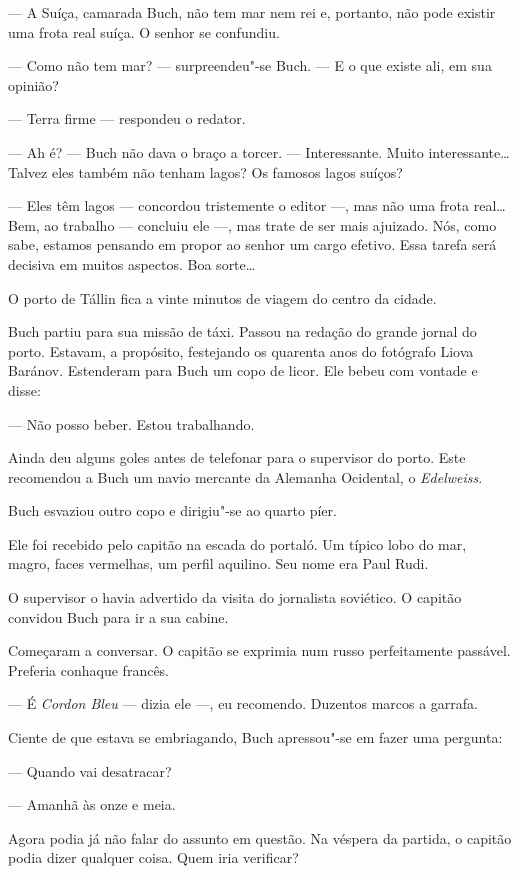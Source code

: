 --- A Suíça, camarada Buch, não tem mar nem rei e, portanto, não pode
existir uma frota real suíça. O senhor se confundiu.

--- Como não tem mar? --- surpreendeu"-se Buch. --- E o que existe ali,
em sua opinião?

--- Terra firme --- respondeu o redator.

--- Ah é? --- Buch não dava o braço a torcer. --- Interessante. Muito
interessante\ldots{} Talvez eles também não tenham lagos? Os famosos lagos
suíços?

--- Eles têm lagos --- concordou tristemente o editor ---, mas não uma
frota real\ldots{} Bem, ao trabalho --- concluiu ele ---, mas trate de ser
mais ajuizado. Nós, como sabe, estamos pensando em propor ao senhor um
cargo efetivo. Essa tarefa será decisiva em muitos aspectos. Boa sorte\ldots{}

O porto de Tállin fica a vinte minutos de viagem do centro da cidade.

Buch partiu para sua missão de táxi. Passou na redação do grande jornal
do porto. Estavam, a propósito, festejando os quarenta anos do fotógrafo
Liova Baránov. Estenderam para Buch um copo de licor. Ele bebeu com
vontade e disse:

--- Não posso beber. Estou trabalhando.

Ainda deu alguns goles antes de telefonar para o supervisor do porto.
Este recomendou a Buch um navio mercante da Alemanha Ocidental, o
\emph{Edelweiss}.

Buch esvaziou outro copo e dirigiu"-se ao quarto píer.

Ele foi recebido pelo capitão na escada do portaló. Um típico lobo do
mar, magro, faces vermelhas, um perfil aquilino. Seu nome era Paul Rudi.

O supervisor o havia advertido da visita do jornalista soviético. O
capitão convidou Buch para ir a sua cabine.

Começaram a conversar. O capitão se exprimia num russo perfeitamente
passável. Preferia conhaque francês.

--- É \emph{Cordon Bleu} --- dizia ele ---, eu recomendo. Duzentos
marcos a garrafa.

Ciente de que estava se embriagando, Buch apressou"-se em fazer uma
pergunta:

--- Quando vai desatracar?

--- Amanhã às onze e meia.

Agora podia já não falar do assunto em questão. Na véspera da partida, o
capitão podia dizer qualquer coisa. Quem iria verificar?

